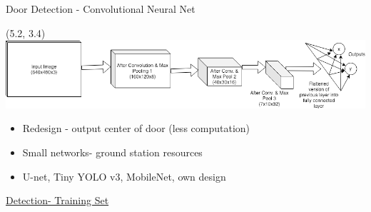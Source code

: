 \documentclass[xcolor=x11names,compress]{beamer}
\begin{document}
\begin{frame}{Door Detection - Convolutional Neural Net}
	\begin{picture}(5.2, 3.4)
        \centering
        \hspace{60pt}\includegraphics[scale=0.20]{arch}
	\end{picture}
	\begin{itemize}
        \item Redesign - output center of door (less computation)
        \item Small networks- ground station resources
        \item U-net, Tiny YOLO v3, MobileNet, own design
	\end{itemize}

    \href{run:../../images/door_detection_nn.avi}{Detection- Training Set}


\end{frame}
\end{document}
